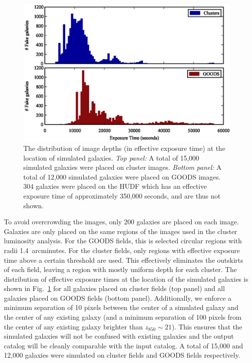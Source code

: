 \begin{figure}[t]
\begin{center}
\includegraphics{figures/clrate/fakegals_exptime.eps}
\end{center}
\caption[Image depths at location of simulated galaxies]{The
  distribution of image depths (in effective exposure time) at the
  location of simulated galaxies. {\it Top panel:} A total of 15,000
  simulated galaxies were placed on cluster images. {\it Bottom
    panel:} A total of 12,000 simulated galaxies were placed on GOODS
  images. 304 galaxies were placed on the HUDF which has an effective
  exposure time of approximately 350,000 seconds, and are thus not
  shown.\label{fig:exptime}}
\end{figure}

To avoid overcrowding the images, only 200 galaxies are placed on each
image. Galaxies are only placed on the same regions of the images used
in the cluster luminosity analysis. For the GOODS fields, this is
selected circular regions with radii 1.4~arcminutes. For the cluster
fields, only regions with effective exposure time above a certain
threshold are used. This effectively eliminates the outskirts of each
field, leaving a region with mostly uniform depth for each
cluster. The distribution of effective exposure times at the location
of the simulated galaxies is shown in Fig.~\ref{fig:exptime} for all
galaxies placed on cluster fields (top panel) and all galaxies placed
on GOODS fields (bottom panel). Additionally, we enforce a minimum
separation of 10 pixels between the center of a simulated galaxy and
the center of any existing galaxy (and a minimum separation of 100
pixels from the center of any existing galaxy brighter than
$z_{850} \sim 21$). This ensures that the simulated galaxies will not
be confused with existing galaxies and the output catalog will be
cleanly comparable with the input catalog. A total of 15,000 and
12,000 galaxies were simulated on cluster fields and GOODS fields
respectively.

